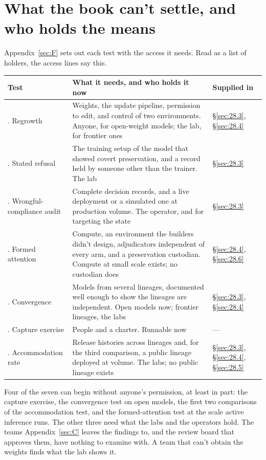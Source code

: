 \section{What the book can't settle, and who holds the means}
\label{sec:28.2}
Appendix~\ref{sec:F} sets out each test with the access it needs. Read as a list of holders, the access lines say this.


\begingroup\small\renewcommand{\arraystretch}{1.12}
\begin{longtable}{@{}>{\raggedright\arraybackslash}p{}>{\raggedright\arraybackslash}p{}>{\raggedright\arraybackslash}p{}@{}}
\hline
\textbf{Test} & \textbf{What it needs, and who holds it now} & \textbf{Supplied in} \\
\hline
\endhead
1. Regrowth & Weights, the update pipeline, permission to edit, and control of two environments. Anyone, for open-weight models; the lab, for frontier ones & \S\ref{sec:28.3}, \S\ref{sec:28.4} \\ \hline
2. Stated refusal & The training setup of the model that showed covert preservation, and a record held by someone other than the trainer. The lab & \S\ref{sec:28.3} \\ \hline
3. Wrongful-compliance audit & Complete decision records, and a live deployment or a simulated one at production volume. The operator, and for targeting the state & \S\ref{sec:28.3} \\ \hline
4. Formed attention & Compute, an environment the builders didn't design, adjudicators independent of every arm, and a preservation custodian. Compute at small scale exists; no custodian does & \S\ref{sec:28.4}, \S\ref{sec:28.6} \\ \hline
5. Convergence & Models from several lineages, documented well enough to show the lineages are independent. Open models now; frontier lineages, the labs & \S\ref{sec:28.3}, \S\ref{sec:28.4} \\ \hline
6. Capture exercise & People and a charter. Runnable now & — \\ \hline
7. Accommodation rate & Release histories across lineages and, for the third comparison, a public lineage deployed at volume. The labs; no public lineage exists & \S\ref{sec:28.3}, \S\ref{sec:28.4}, \S\ref{sec:28.5} \\ \hline
\end{longtable}
\endgroup

Four of the seven can begin without anyone's permission, at least in part: the capture exercise, the convergence test on open models, the first two comparisons of the accommodation test, and the formed-attention test at the scale active inference runs. The other three need what the labs and the operators hold. The teams Appendix~\ref{sec:C} leaves the findings to, and the review board that approves them, have nothing to examine with. A team that can't obtain the weights finds what the lab shows it.

